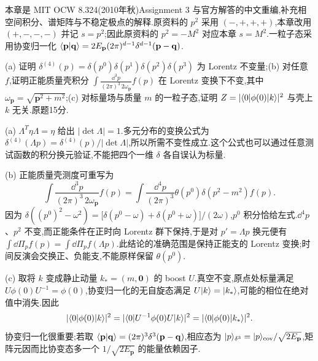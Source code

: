 本章是 MIT OCW 8.324(2010年秋)Assignment 3 与官方解答的中文重编,补充相空间积分、谱矩阵与不稳定极点的解释.原资料的 $p^2$ 采用 $(-,+,+,+)$,本章改用 $(+,-,-,-)$ 并记 $s=p^2$;因此原资料的 $p^2=-M^2$ 对应本章 $s=M^2$.一粒子态采用协变归一化 $\langle \mathbf p\vert \mathbf q\rangle=2E_{\mathbf p}(2\pi)^{d-1}\delta^{d-1}(\mathbf p-\mathbf q)$.

\begin{exercise}
(a) 证明 $\delta^{(4)}(p)=\delta(p^0)\delta(p^1)\delta(p^2)\delta(p^3)$ 为 Lorentz 不变量;(b) 对任意 $f$,证明正能质量壳积分 $\int\frac{\dd^3p}{(2\pi)^3\,2\omega_{\mathbf p}}f(p)$ 在 Lorentz 变换下不变,其中 $\omega_{\mathbf p}=\sqrt{\mathbf p^2+m^2}$;(c) 对标量场与质量 $m$ 的一粒子态,证明 $Z=|\langle 0\rvert\phi(0)\lvert k\rangle|^2$ 与壳上 $k$ 无关.原题15分.
\end{exercise}
\begin{solution}
(a) $\Lambda^T\eta\Lambda=\eta$ 给出 $|\det\Lambda|=1$.多元分布的变换公式为 $\delta^{(4)}(\Lambda p)=\delta^{(4)}(p)/|\det\Lambda|$,所以所需不变性成立.这个公式也可以通过任意测试函数的积分换元验证,不能把四个一维 $\delta$ 各自误认为标量.

(b) 正能质量壳测度可重写为
\[
\int\frac{\dd^3p}{(2\pi)^3\,2\omega_{\mathbf p}}f(p)
=\int\frac{\dd^4p}{(2\pi)^3}\theta(p^0)\delta(p^2-m^2)f(p).
\]
因为 $\delta((p^0)^2-\omega^2)=\bigl[\delta(p^0-\omega)+\delta(p^0+\omega)\bigr]/(2\omega)$,$p^0$ 积分恰给左式.$\dd^4p$、$p^2$ 不变,而正能条件在正时向 Lorentz 群下保持,于是对 $p'=\Lambda p$ 换元便有 $\int\dd\Pi_p f(p)=\int\dd\Pi_p f(\Lambda p)$.此结论的准确范围是保持正能支的 Lorentz 变换;时间反演会交换正、负能支,不能原样保留 $\theta(p^0)$.

(c) 取将 $k$ 变成静止动量 $k_*=(m,\mathbf0)$ 的 boost $U$.真空不变,原点处标量满足 $U\phi(0)U^{-1}=\phi(0)$,协变归一化的无自旋态满足 $U\lvert k\rangle=\lvert k_*\rangle$,可能的相位在绝对值中消失.因此
\[
|\langle 0\rvert\phi(0)\lvert k\rangle|^2
=|\langle 0\rvert U^{-1}\phi(0)U\lvert k\rangle|^2
=|\langle 0\rvert\phi(0)\lvert k_*\rangle|^2.
\]
协变归一化很重要;若取 $\langle \mathbf p\vert \mathbf q\rangle=(2\pi)^3\delta^3(\mathbf p-\mathbf q)$,相应态为 $\lvert p\rangle_{\delta^3}=\lvert p\rangle_{\rm cov}/\sqrt{2E_{\mathbf p}}$,矩阵元因而比协变态多一个 $1/\sqrt{2E_{\mathbf p}}$ 的能量依赖因子.
\end{solution}

